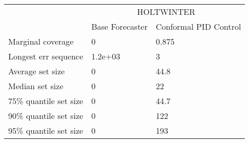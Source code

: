 \begin{tabular}{lll}
\toprule
& \multicolumn{2}{c}{HOLTWINTER} \\
& Base Forecaster & Conformal PID Control \\
\midrule
Marginal coverage & 0 & 0.875 \\
Longest err sequence & 1.2e+03 & 3 \\
Average set size & 0 & 44.8 \\
Median set size & 0 & 22 \\
75\% quantile set size & 0 & 44.7 \\
90\% quantile set size & 0 & 122 \\
95\% quantile set size & 0 & 193 \\
\bottomrule
\end{tabular}
